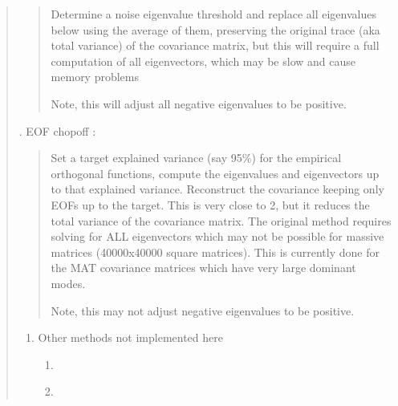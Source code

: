\documentclass[letterpaper,10pt,english]{sphinxmanual}
\begin{document}
\begin{quote}
\begin{quote}
\sphinxAtStartPar
Determine a noise eigenvalue threshold and replace all eigenvalues below
using the average of them, preserving the original trace (aka total
variance) of the covariance matrix, but this will require a full
computation of all eigenvectors, which may be slow and cause memory
problems

\sphinxAtStartPar
Note, this will adjust all negative eigenvalues to be positive.
\end{quote}

. EOF chop\sphinxhyphen{}off \sphinxhyphen{}
:
\begin{quote}

\sphinxAtStartPar
Set a target explained variance (say 95\%) for the empirical orthogonal
functions, compute the eigenvalues and eigenvectors up to that explained
variance. Reconstruct the covariance keeping only EOFs up to the target.
This is very close to 2, but it reduces the total variance of the
covariance matrix. The original method requires solving for ALL
eigenvectors which may not be possible for massive matrices
(40000x40000 square matrices). This is currently done for the MAT
covariance matrices which have very large dominant modes.

\sphinxAtStartPar
Note, this may not adjust negative eigenvalues to be positive.
\end{quote}
\begin{enumerate}
%
\setcounter{enumi}{3}
\item {}
\sphinxAtStartPar
Other methods not implemented here
\begin{enumerate}
%
\item {} \begin{description}
\sphinxAtStartPar
{}

\end{description}

\item {} \begin{description}
\sphinxAtStartPar
{}

\sphinxAtStartPar
{}

\end{description}

\end{enumerate}

\end{enumerate}
\end{quote}
\end{document}
